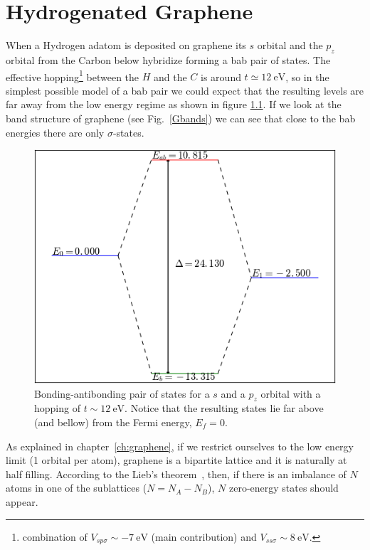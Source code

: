 \chapter{Hydrogenated Graphene}
\label{ch:H_graphene}
When a Hydrogen adatom is deposited on graphene its $s$ orbital and the $p_z$ orbital from the Carbon below hybridize forming a \ac{bab} pair of states. The effective hopping\footnote{combination of $V_{sp\sigma}\sim\SI{-7}{\eV}$ (main contribution) and $V_{ss\sigma}\sim\SI{8}{\eV}$.} between the $H$ and the $C$ is around $t\simeq\SI{12}{\eV}$, so in the simplest possible model of a \ac{bab} pair we could expect that the resulting levels are far away from the low energy regime as shown in figure \ref{bab}. If we look at the band structure of graphene (see Fig.~\ref{Gbands})  we can see that close to the \ac{bab} energies there are only $\sigma$-states.
\begin{figure}[h!]
\centering
\includegraphics{chapter05/figures/bonding_antibonding.png}
\caption{Bonding-antibonding pair of states for a $s$ and a $p_z$ orbital with a hopping of $t\sim\SI{12}{\eV}$. Notice that the resulting states lie far above (and bellow) from the Fermi energy, $E_f=0$.}
\label{bab}
\end{figure}
\FloatBarrier
As explained in chapter~\ref{ch:graphene}, if we restrict ourselves to the low energy limit (1 orbital per atom), graphene is a bipartite lattice and it is naturally at half filling. According to the Lieb's theorem~\cite{Lieb1989}, then, if there is an imbalance of $N$ atoms in one of the sublattices ($N=N_A-N_B$), $N$ zero-energy states should appear.\\

